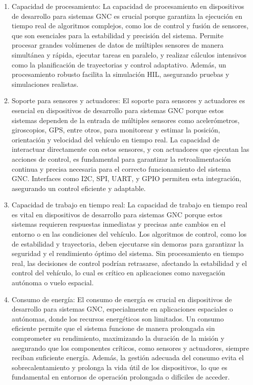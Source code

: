 \begin{enumerate}
    \item Capacidad de procesamiento: La capacidad de procesamiento en dispositivos de desarrollo para sistemas GNC es crucial porque garantiza la ejecución en tiempo real de algoritmos complejos, como los de control y fusión de sensores, que son esenciales para la estabilidad y precisión del sistema. Permite procesar grandes volúmenes de datos de múltiples sensores de manera simultánea y rápida, ejecutar tareas en paralelo, y realizar cálculos intensivos como la planificación de trayectorias y control adaptativo. Además, un procesamiento robusto facilita la simulación HIL, asegurando pruebas y simulaciones realistas.

    \item Soporte para sensores y actuadores: El soporte para sensores y actuadores es esencial en dispositivos de desarrollo para sistemas GNC porque estos sistemas dependen de la entrada de múltiples sensores como acelerómetros, giroscopios, GPS, entre otros, para monitorear y estimar la posición, orientación y velocidad del vehículo en tiempo real. La capacidad de interactuar directamente con estos sensores, y con actuadores que ejecutan las acciones de control, es fundamental para garantizar la retroalimentación continua y precisa necesaria para el correcto funcionamiento del sistema GNC. Interfaces como I2C, SPI, UART, y GPIO permiten esta integración, asegurando un control eficiente y adaptable.

    \item Capacidad de trabajo en tiempo real: La capacidad de trabajo en tiempo real es vital en dispositivos de desarrollo para sistemas GNC porque estos sistemas requieren respuestas inmediatas y precisas ante cambios en el entorno o en las condiciones del vehículo. Los algoritmos de control, como los de estabilidad y trayectoria, deben ejecutarse sin demoras para garantizar la seguridad y el rendimiento óptimo del sistema. Sin procesamiento en tiempo real, las decisiones de control podrían retrasarse, afectando la estabilidad y el control del vehículo, lo cual es crítico en aplicaciones como navegación autónoma o vuelo espacial.

    \item Consumo de energía: El consumo de energía es crucial en dispositivos de desarrollo para sistemas GNC, especialmente en aplicaciones espaciales o autónomas, donde los recursos energéticos son limitados. Un consumo eficiente permite que el sistema funcione de manera prolongada sin comprometer su rendimiento, maximizando la duración de la misión y asegurando que los componentes críticos, como sensores y actuadores, siempre reciban suficiente energía. Además, la gestión adecuada del consumo evita el sobrecalentamiento y prolonga la vida útil de los dispositivos, lo que es fundamental en entornos de operación prolongada o difíciles de acceder.


\end{enumerate}
